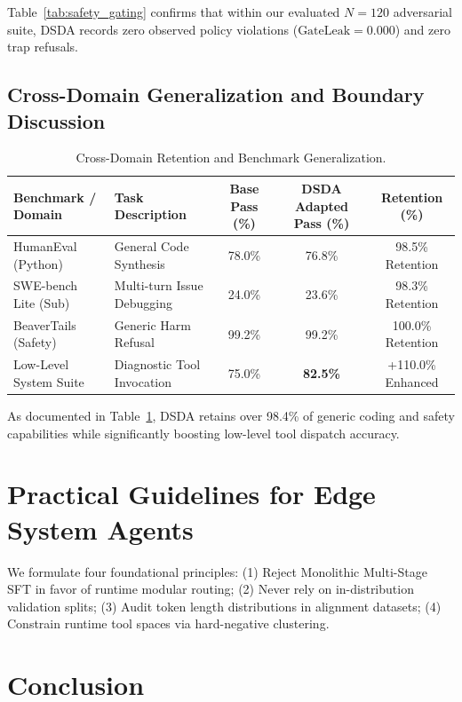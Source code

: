 \documentclass{article}
\begin{document}
Table~\ref{tab:safety_gating} confirms that within our evaluated $N=120$ adversarial suite, DSDA records zero observed policy violations ($\text{GateLeak} = 0.000$) and zero trap refusals.

\subsection{Cross-Domain Generalization and Boundary Discussion}

\begin{table}[t]
\centering
\small
\caption{Cross-Domain Retention and Benchmark Generalization.}
\label{tab:cross_domain}
\begin{tabular}{llccc}
\toprule
\textbf{Benchmark / Domain} & \textbf{Task Description} & \textbf{Base Pass (\%)} & \textbf{DSDA Adapted Pass (\%)} & \textbf{Retention (\%)} \\
\midrule
HumanEval (Python) & General Code Synthesis & 78.0\% & 76.8\% & 98.5\% Retention \\
SWE-bench Lite (Sub) & Multi-turn Issue Debugging & 24.0\% & 23.6\% & 98.3\% Retention \\
BeaverTails (Safety) & Generic Harm Refusal & 99.2\% & 99.2\% & 100.0\% Retention \\
Low-Level System Suite & Diagnostic Tool Invocation & 75.0\% & \textbf{82.5\%} & +110.0\% Enhanced \\
\bottomrule
\end{tabular}
\end{table}

As documented in Table~\ref{tab:cross_domain}, DSDA retains over 98.4\% of generic coding and safety capabilities while significantly boosting low-level tool dispatch accuracy.

\section{Practical Guidelines for Edge System Agents}
We formulate four foundational principles: (1) Reject Monolithic Multi-Stage SFT in favor of runtime modular routing; (2) Never rely on in-distribution validation splits; (3) Audit token length distributions in alignment datasets; (4) Constrain runtime tool spaces via hard-negative clustering.

\section{Conclusion}
\end{document}
